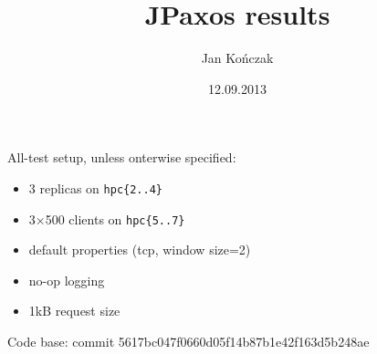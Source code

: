 \documentclass[a4paper,11pt,notitlepage,hidelinks]{article}
\author{Jan Kończak}
\title{JPaxos results}
\date{12.09.2013}
\begin{document}

All-test setup, unless onterwise specified:
\begin{itemize}
 \item 3 replicas on \texttt{hpc\{2..4\}}
 \item 3×500 clients on \texttt{hpc\{5..7\}}
 \item default properties (tcp, window size=2)
 \item no-op logging
 \item 1kB request size
\end{itemize}

Code base: commit 5617bc047f0660d05f14b87b1e42f163d5b248ae

 

 
 
\end{document}
